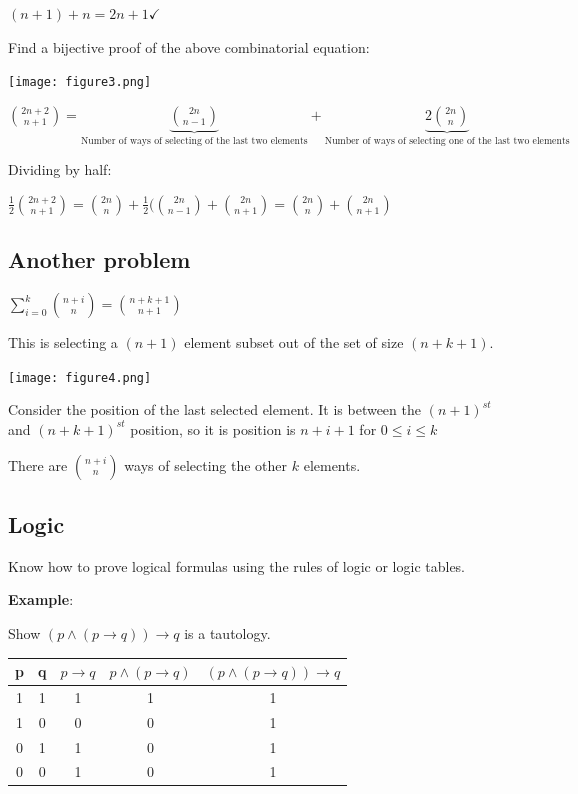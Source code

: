 \documentclass[9pt, letterpaper, oneside]{article}
\begin{document}
$(n + 1) + n = 2n + 1 \checkmark$

Find a bijective proof of the above combinatorial equation:

\texttt{[image: figure3.png]}

${2n + 2 \choose n + 1} = \underbrace{{2n \choose n - 1}}_{\text{Number of ways of selecting of the last two elements}} + \underbrace{2 {2n \choose n}}_{\text{Number of ways of selecting one of the last two elements}} $

Dividing by half:

$\frac{1}{2} {2n + 2 \choose n + 1} = {2n \choose n} + \frac{1}{2}({2n \choose n - 1} + {2n \choose n + 1} = {2n \choose n} + {2n \choose n+1}$

\subsection{Another problem}

$\displaystyle \sum_{i=0}^{k} {n + i \choose n} = {n + k + 1 \choose n + 1}$

This is selecting a $(n+1)$ element subset out of the set of size $(n + k + 1)$.

\texttt{[image: figure4.png]}

Consider the position of the last selected element. It is between the $(n+1)^{st}$ and $(n + k + 1)^{st}$ position, so it is position is $n + i + 1$ for $0 \leq i \leq k$

There are ${n + i \choose n}$ ways of selecting the other $k$ elements.

\subsection{Logic}

Know how to prove logical formulas using the rules of logic or logic tables.

\textbf{Example}:

Show $(p \wedge (p \to q)) \to q$ is a tautology.

\begin{tabular}{ |c |c| c| c| c| }
p & q & $p \to q$ & $p \wedge (p \to q)$ & $(p \wedge (p \to q)) \to q$ \\
\hline
1 & 1 &   1   &         1        &         1 \\
1 & 0 &   0   &         0        &  1 \\
0 & 1 &   1   &         0        &  1 \\
0 & 0 &   1   &         0        &  1 \\
\end{tabular}
\end{document}
